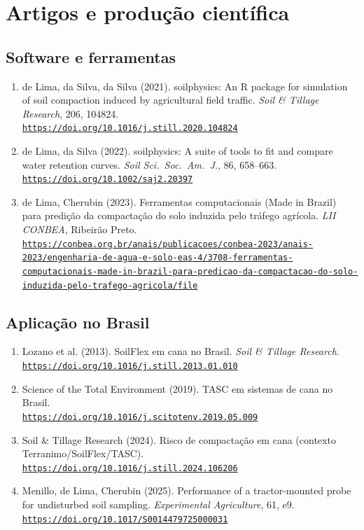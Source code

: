 \documentclass[12pt,a4paper]{article}
\newcommand{\Section}[1]{\needspace{12\baselineskip}\section{#1}}
\newcommand{\SubsectionKeep}[1]{\needspace{10\baselineskip}\subsection{#1}}
\newcommand{\Link}[1]{\href{#1}{\nolinkurl{#1}}}
\newenvironment{NoBreakEnumerate}
{\begin{samepage}\begin{enumerate}}
{\end{enumerate}\end{samepage}}
\begin{document}
\Section{Artigos e produção científica}

\SubsectionKeep{Software e ferramentas}
\begin{NoBreakEnumerate}
  \item de Lima, da Silva, da Silva (2021). soilphysics: An R package for simulation of soil compaction induced by agricultural field traffic. \textit{Soil \& Tillage Research}, 206, 104824.\\
  \Link{https://doi.org/10.1016/j.still.2020.104824}

  \item de Lima, da Silva (2022). soilphysics: A suite of tools to fit and compare water retention curves. \textit{Soil Sci.\ Soc.\ Am.\ J.}, 86, 658--663.\\
  \Link{https://doi.org/10.1002/saj2.20397}

  \item de Lima, Cherubin (2023). Ferramentas computacionais (Made in Brazil) para predição da compactação do solo induzida pelo tráfego agrícola. \textit{LII CONBEA}, Ribeirão Preto.\\
  \Link{https://conbea.org.br/anais/publicacoes/conbea-2023/anais-2023/engenharia-de-agua-e-solo-eas-4/3708-ferramentas-computacionais-made-in-brazil-para-predicao-da-compactacao-do-solo-induzida-pelo-trafego-agricola/file}
\end{NoBreakEnumerate}

\SubsectionKeep{Aplicação no Brasil}
\begin{NoBreakEnumerate}
  \item Lozano et al. (2013). SoilFlex em cana no Brasil. \textit{Soil \& Tillage Research}.\\
  \Link{https://doi.org/10.1016/j.still.2013.01.010}

  \item Science of the Total Environment (2019). TASC em sistemas de cana no Brasil.\\
  \Link{https://doi.org/10.1016/j.scitotenv.2019.05.009}

  \item Soil \& Tillage Research (2024). Risco de compactação em cana (contexto Terranimo/SoilFlex/TASC).\\
  \Link{https://doi.org/10.1016/j.still.2024.106206}

  \item Menillo, de Lima, Cherubin (2025). Performance of a tractor-mounted probe for undisturbed soil sampling. \textit{Experimental Agriculture}, 61, e9.\\
  \Link{https://doi.org/10.1017/S0014479725000031}
\end{NoBreakEnumerate}
\end{document}
